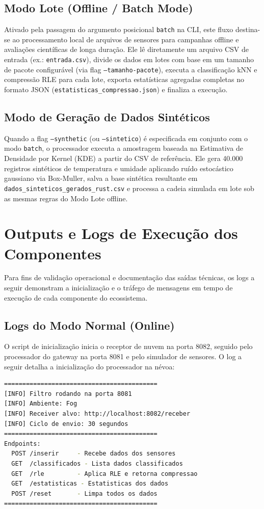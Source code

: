 \documentclass[
	12pt,
	openright,
	oneside,
	a4paper,
	english,
	brazil
	]{abntex2}
\begin{document}
\subsection{Modo Lote (Offline / Batch Mode)}
Ativado pela passagem do argumento posicional \texttt{batch} na CLI, este fluxo destina-se ao processamento local de arquivos de sensores para campanhas offline e avaliações científicas de longa duração. Ele lê diretamente um arquivo CSV de entrada (ex.: \texttt{entrada.csv}), divide os dados em lotes com base em um tamanho de pacote configurável (via flag \texttt{--tamanho-pacote}), executa a classificação kNN e compressão RLE para cada lote, exporta estatísticas agregadas completas no formato JSON (\texttt{estatisticas\_compressao.json}) e finaliza a execução.

\subsection{Modo de Geração de Dados Sintéticos}
Quando a flag \texttt{--synthetic} (ou \texttt{--sintetico}) é especificada em conjunto com o modo \texttt{batch}, o processador executa a amostragem baseada na Estimativa de Densidade por Kernel (KDE) a partir do CSV de referência. Ele gera 40.000 registros sintéticos de temperatura e umidade aplicando ruído estocástico gaussiano via Box-Muller, salva a base sintética resultante em \texttt{dados\_sinteticos\_gerados\_rust.csv} e processa a cadeia simulada em lote sob as mesmas regras do Modo Lote offline.

\section{Outputs e Logs de Execução dos Componentes}

Para fins de validação operacional e documentação das saídas técnicas, os logs a seguir demonstram a inicialização e o tráfego de mensagens em tempo de execução de cada componente do ecossistema.

\subsection{Logs do Modo Normal (Online)}
O script de inicialização inicia o receptor de nuvem na porta 8082, seguido pelo processador do gateway na porta 8081 e pelo simulador de sensores. O log a seguir detalha a inicialização do processador na névoa:

\begin{lstlisting}[language=bash, caption={Log de inicialização do Processador na Névoa}]
==========================================
[INFO] Filtro rodando na porta 8081
[INFO] Ambiente: Fog
[INFO] Receiver alvo: http://localhost:8082/receber
[INFO] Ciclo de envio: 30 segundos
==========================================
Endpoints:
  POST /inserir     - Recebe dados dos sensores
  GET  /classificados - Lista dados classificados
  GET  /rle         - Aplica RLE e retorna compressao
  GET  /estatisticas - Estatisticas dos dados
  POST /reset       - Limpa todos os dados
==========================================
\end{lstlisting}
\end{document}
